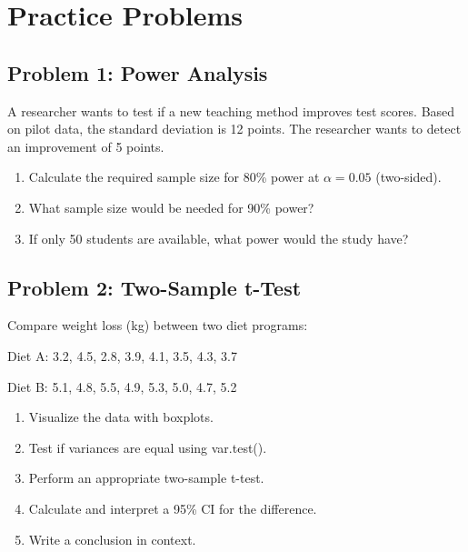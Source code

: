 \documentclass[11pt]{article}
\begin{document}
\vspace{3cm}

\section{Practice Problems}

\subsection{Problem 1: Power Analysis}

A researcher wants to test if a new teaching method improves test scores. Based on pilot data, the standard deviation is 12 points. The researcher wants to detect an improvement of 5 points.

\begin{enumerate}[label=\alph*)]
\item Calculate the required sample size for 80\% power at $\alpha = 0.05$ (two-sided).
\item What sample size would be needed for 90\% power?
\item If only 50 students are available, what power would the study have?
\end{enumerate}

\vspace{2cm}

\subsection{Problem 2: Two-Sample t-Test}

Compare weight loss (kg) between two diet programs:

Diet A: 3.2, 4.5, 2.8, 3.9, 4.1, 3.5, 4.3, 3.7

Diet B: 5.1, 4.8, 5.5, 4.9, 5.3, 5.0, 4.7, 5.2

\begin{enumerate}[label=\alph*)]
\item Visualize the data with boxplots.
\item Test if variances are equal using var.test().
\item Perform an appropriate two-sample t-test.
\item Calculate and interpret a 95\% CI for the difference.
\item Write a conclusion in context.
\end{enumerate}

\vspace{2cm}
\end{document}
